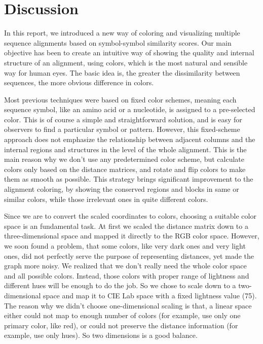 \chapter{Discussion}\label{chap:Discussion}

In this report, we introduced a new way of coloring and visualizing multiple sequence alignments based on symbol-symbol similarity scores. Our main objective has been to create an intuitive way of showing the quality and internal structure of an alignment, using colors, which is the most natural and sensible way for human eyes. The basic idea is, the greater the dissimilarity between sequences, the more obvious difference in colors.

Most previous techniques were based on fixed color schemes, meaning each sequence symbol, like an amino acid or a nucleotide, is assigned to a pre-selected color. This is of course a simple and straightforward solution, and is easy for observers to find a particular symbol or pattern. However, this fixed-scheme approach does not emphasize the relationship between adjacent columns and the internal regions and structures in the level of the whole alignment. This is the main reason why we don’t use any predetermined color scheme, but calculate colors only based on the distance matrices, and rotate and flip colors to make them as smooth as possible. This strategy brings significant improvement to the alignment coloring, by showing the conserved regions and blocks in same or similar colors, while those irrelevant ones in quite different colors.

Since we are to convert the scaled coordinates to colors, choosing a suitable color space is an fundamental task. At first we scaled the distance matrix down to a three-dimensional space and mapped it directly to the RGB color space. However, we soon found a problem, that some colors, like very dark ones and very light ones, did not perfectly serve the purpose of representing distances, yet made the graph more noisy. We realized that we don’t really need the whole color space and all possible colors. Instead, those colors with proper range of lightness and different hues will be enough to do the job. So we chose to scale down to a two-dimensional space and map it to CIE Lab space with a fixed lightness value (75). The reason why we didn’t choose one-dimensional scaling is that, a linear space either could not map to enough number of colors (for example, use only one primary color, like red), or could not preserve the distance information (for example, use only hues). So two dimensions is a good balance.


